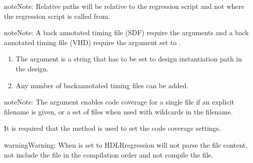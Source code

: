 \documentclass[letterpaper,10pt,english]{sphinxmanual}
\begin{document}
\begin{sphinxadmonition}{note}{Note:}
\sphinxAtStartPar
Relative paths will be relative to the regression script
and not where the regression script is called from.
\end{sphinxadmonition}

\begin{sphinxadmonition}{note}{Note:}
\sphinxAtStartPar
A back annotated timing file (SDF) require the  arguments and a back annotated timing file (VHD)
require the  argument set to .
\begin{enumerate}
%
\item {} 
\sphinxAtStartPar
The  argument is a string that has to be set to design instantiation path in the design.

\item {} 
\sphinxAtStartPar
Any number of back\sphinxhyphen{}annotated timing files can be added.

\end{enumerate}
\end{sphinxadmonition}

\begin{sphinxadmonition}{note}{Note:}
\sphinxAtStartPar
The  argument enables code coverage for a single file if an explicit filename is given, or
a set of files when used with wildcards in the filename.

\sphinxAtStartPar
It is required that the {\hyperref[\detokenize{api:set-code-coverage}]{}} method is used to set the code coverage settings.
\end{sphinxadmonition}

\begin{sphinxadmonition}{warning}{Warning:}
\sphinxAtStartPar
When  is set to  HDLRregression will not parse the file content, not include the file in the
compilation order and not compile the file.
\end{sphinxadmonition}
\end{document}
